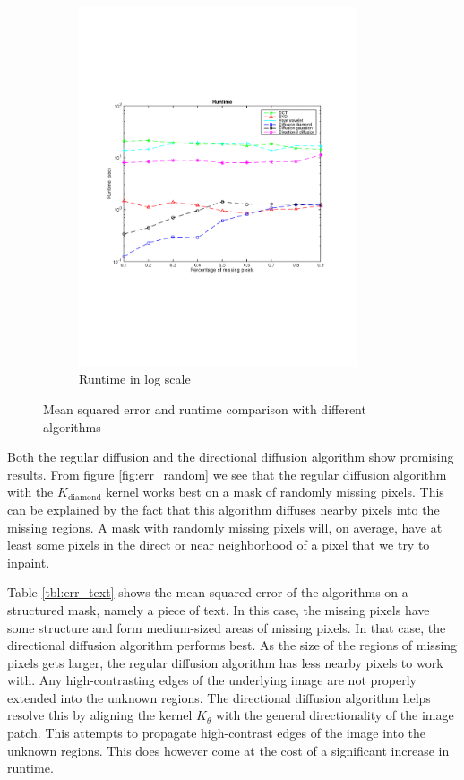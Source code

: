 \begin{figure}
\begin{subfigure}[b]{0.49\textwidth}
		\includegraphics[clip, trim=2cm 7cm 2cm 6cm, width=0.9\textwidth]{figures/runtime_vector}
		\caption{Runtime in log scale}
		\label{fig:runtime}
	\end{subfigure}
	
	\caption{Mean squared error and runtime comparison with different algorithms}
	\label{fig:rmd_results}
\end{figure}


Both the regular diffusion and the directional diffusion algorithm show promising results. From figure \ref{fig:err_random} we see that the regular diffusion algorithm with the $K_{\text{diamond}}$ kernel works best on a mask of randomly missing pixels. This can be explained by the fact that this algorithm diffuses nearby pixels into the missing regions. A mask with randomly missing pixels will, on average, have at least some pixels in the direct or near neighborhood of a pixel that we try to inpaint.

Table \ref{tbl:err_text} shows the mean squared error of the algorithms on a structured mask, namely a piece of text. In this case, the missing pixels have some structure and form medium-sized areas of missing pixels. In that case, the directional diffusion algorithm performs best. As the size of the regions of missing pixels gets larger, the regular diffusion algorithm has less nearby pixels to work with. Any high-contrasting edges of the underlying image are not properly extended into the unknown regions. The directional diffusion algorithm helps resolve this by aligning the kernel  $K_{\theta}$ with the general directionality of the image patch. This attempts to propagate high-contrast edges of the image into the unknown regions. This does however come at the cost of a significant increase in runtime.

